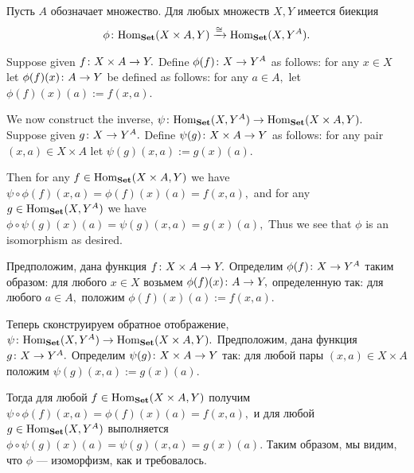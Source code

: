 \documentclass[CT4S-EN-RU]{subfiles}
\begin{document}
\begin{propositionRUS}[Каррирование]\label{prop:curry}
Пусть $A$ обозначает множество. Для любых множеств $X,Y$ имеется биекция%
%
\begin{align}\label{dia:curry bijection}
\phi\colon\textnormal{Hom}_{\mathbf{Set}}(X\times A,Y)\xrightarrow{\cong}\textnormal{Hom}_{\mathbf{Set}}(X,Y^A).
\end{align}
\end{propositionRUS}

\begin{proofENG}
Suppose given $f\colon X\times A\rightarrow Y.$ Define $\phi(f)\colon X\rightarrow Y^A$ as follows: for any $x\in X$ let $\phi(f)(x)\colon A\rightarrow Y$ be defined as follows: for any $a\in A,$ let $\phi(f)(x)(a):=f(x,a).$ 

We now construct the inverse, $\psi\colon\textnormal{Hom}_{\mathbf{Set}}(X,Y^A)\rightarrow\textnormal{Hom}_{\mathbf{Set}}(X\times A,Y).$ Suppose given $g\colon X\rightarrow Y^A.$ Define $\psi(g)\colon X\times A\rightarrow Y$ as follows: for any pair $(x,a)\in X\times A$ let $\psi(g)(x,a):=g(x)(a).$ 

Then for any $f\in\textnormal{Hom}_{\mathbf{Set}}(X\times A,Y)$ we have $\psi\circ\phi(f)(x,a)=\phi(f)(x)(a)=f(x,a),$ and for any $g\in\textnormal{Hom}_{\mathbf{Set}}(X,Y^A)$ we have $\phi\circ\psi(g)(x)(a)=\psi(g)(x,a)=g(x)(a),$ Thus we see that $\phi$ is an isomorphism as desired.
\end{proofENG}

\begin{proofRUS}
Предположим, дана функция $f\colon X\times A\rightarrow Y.$ Определим $\phi(f)\colon X\rightarrow Y^A$ таким образом: для любого $x\in X$ возьмем $\phi(f)(x)\colon A\rightarrow Y,$ определенную так: для любого $a\in A,$ положим $\phi(f)(x)(a):=f(x,a).$ 

Теперь сконструируем обратное отображение, $\psi\colon\textnormal{Hom}_{\mathbf{Set}}(X,Y^A)\rightarrow\textnormal{Hom}_{\mathbf{Set}}(X\times A,Y).$  Предположим, дана функция $g\colon X\rightarrow Y^A.$ Определим $\psi(g)\colon X\times A\rightarrow Y$ так: для любой пары $(x,a)\in X\times A$ положим $\psi(g)(x,a):=g(x)(a).$ 

Тогда для любой $f\in\textnormal{Hom}_{\mathbf{Set}}(X\times A,Y)$ получим $\psi\circ\phi(f)(x,a)=\phi(f)(x)(a)=f(x,a),$ и для любой $g\in\textnormal{Hom}_{\mathbf{Set}}(X,Y^A)$ выполняется $\phi\circ\psi(g)(x)(a)=\psi(g)(x,a)=g(x)(a).$ Таким образом, мы видим, что $\phi$ — изоморфизм, как и требовалось.
\end{proofRUS}
\end{document}
